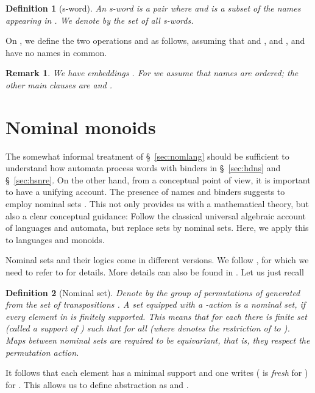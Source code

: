 \documentclass[runningheads,a4paper]{llncs}
\newtheorem{definition}{Theorem}[section]
\newtheorem{remark}{Theorem}[section]
\newtheorem{definition}{Definition}[section]
\newtheorem{remark}{Remark}[section]
\begin{document}
\begin{definition}[s-word]
  An \emph{s-word} is a pair  where
   and  is a subset of the
  names appearing in . We denote by  the set of all
  s-words.
\end{definition}
On , we define the two operations  and  as
follows, assuming that  and ,  and ,  and  have no
names in common.



\begin{remark}\label{rmk:slgm}
We have embeddings 
.
For  we assume that names are ordered; the other main clauses
are  and
.
\end{remark}



\section{Nominal monoids}\label{sec:nom-monoid}

The somewhat informal treatment of \S~\ref{sec:nomlang} should be
sufficient to understand how automata process words with binders in
\S~\ref{sec:hdns} and \S~\ref{sec:hsnre}. On the other hand, from a
conceptual point of view, it is important to have a unifying
account. The presence of names and binders suggests to employ nominal
sets \cite{gp02}. This not only provides us with a mathematical
theory, but also a clear conceptual guidance: Follow the classical
universal algebraic account of languages and automata, but replace
sets by nominal sets. Here, we apply this to languages and monoids.

Nominal sets and their logics come in different versions. We follow
\cite{gabb-math:nom-alg}, for which we need to refer to for
details. More details can also be found in \cite{kst10}. Let us just
recall

\begin{definition}[Nominal set]
  Denote by  the group of permutations of
   generated from the set of transpositions . A set  equipped with a
  -action  is a \emph{nominal set}, if
  every element in  is finitely supported. This means that for each
   there is finite set  (called a support of
  ) such that  for all
   (where  denotes the
  restriction of  to ). Maps between nominal sets are required
  to be equivariant, that is, they respect the permutation action.
\end{definition}
It follows 
that each element  has a minimal support  and one
writes  ( is \emph{fresh} for ) for
. This allows us to define abstraction \cite[Lemma
5.1]{gp02} as 
and 
.
\end{document}
